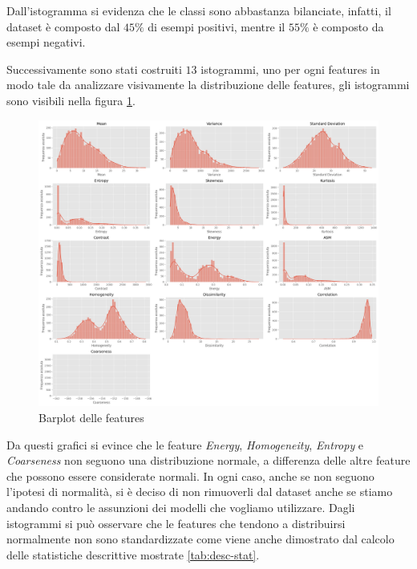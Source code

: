 Dall'istogramma si evidenza che le classi sono abbastanza bilanciate, infatti, 
il dataset è composto dal $45\%$ di esempi positivi, mentre il $55\%$ è composto
da esempi negativi. 

Successivamente sono stati costruiti $13$ istogrammi, uno per ogni features
in modo tale da analizzare visivamente la distribuzione delle features, gli 
istogrammi sono visibili nella figura \ref{fig:barplot_features}.


\begin{figure}
      \centering
      \includegraphics[width=\textwidth]{img/analisi/barplot.png}
      \caption{Barplot delle features}
      \label{fig:barplot_features}
\end{figure}

Da questi grafici si evince che le feature \textit{Energy}, \textit{Homogeneity},
\textit{Entropy} e \textit{Coarseness} non seguono una distribuzione normale, a differenza delle
altre feature che possono essere considerate normali. In ogni caso, anche se non
seguono l'ipotesi di normalità, si è deciso di non rimuoverli dal dataset anche se
stiamo andando contro le assunzioni dei modelli che vogliamo utilizzare. Dagli 
istogrammi si può osservare che le features che tendono a distribuirsi normalmente
non sono standardizzate come viene anche dimostrato dal calcolo delle statistiche
descrittive mostrate \ref{tab:desc-stat}.

